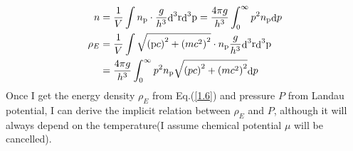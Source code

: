\documentclass[reprint]{revtex4-1}
\begin{document}
\begin{align}
n &= \frac{1}{V}\int {{n_{\rm{p}}} \cdot \frac{g}{{{h^3}}}{\mathop{\rm d}\nolimits}^3 {\rm{r}}{\mathop{\rm d}\nolimits}^3 {\rm{p}}}  = \frac{{4\pi g}}{{{h^3}}}\int_0^\infty  {{p^2}{n_{\rm{p}}}{\mathop{\rm d}\nolimits} p} \label{1.5}\\
{\rho _E} &= \frac{1}{V}\int {\sqrt {{{\left( {{\rm{p}}c} \right)}^2} + {{\left( {m{c^2}} \right)}^2}}  \cdot {n_{\rm{p}}}\frac{g}{{{h^3}}}{\mathop{\rm d}\nolimits}^3 {\rm{r}}{\mathop{\rm d}\nolimits}^3 {\rm{p}}}  \nonumber \\
&= \frac{{4\pi g}}{{{h^3}}}\int_0^\infty  {{p^2}{n_{\rm{p}}}\sqrt {{{\left( {pc} \right)}^2} + {{\left( {m{c^2}} \right)}^2}} {\mathop{\rm d}\nolimits} p} \label{1.6}
\end{align}
Once I get the energy density ${\rho _E}$ from Eq.(\ref{1.6}) and pressure $P$ from Landau potential, I can derive the implicit relation between ${\rho _E}$ and $P$, although it will always depend on the temperature(I assume chemical potential $\mu$  will be cancelled).
\end{document}

